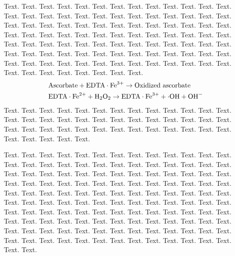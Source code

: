 \documentclass[a4,center,fleqn]{NAR}
\begin{document}
Text. Text. Text. Text. Text. Text. Text. Text. Text. Text. Text.
Text. Text. Text. Text. Text. Text. Text. Text. Text. Text. Text.
Text. Text. Text. Text. Text. Text. Text. Text. Text. Text. Text.
Text. Text. Text. Text. Text. Text. Text. Text. Text. Text. Text.
Text. Text. Text. Text. Text. Text. Text. Text. Text. Text. Text.
Text. Text. Text. Text. Text. Text. Text. Text. Text. Text. Text.
Text. Text. Text. Text. Text. Text. Text. Text. Text. Text. Text.
Text. Text. Text. Text. Text. Text. Text. Text. Text. Text. Text.
Text. Text. Text. Text. Text. Text. Text. Text. Text. Text. Text.
\begin{align*}
&\mathrm{Ascorbate} + \mathrm{EDTA} \cdot \mathrm{Fe}^{3+} \to
\hbox{Oxidized ascorbate}
\\
&\mathrm{EDTA} \cdot \mathrm{Fe}^{2+} + \mathrm{H}_2
\mathrm{O}_2 \to
\mathrm{EDTA} \cdot \mathrm{Fe}^{3+} + \cdot
\mathrm{OH} + \mathrm{OH}^-
\end{align*}
Text. Text. Text. Text. Text. Text. Text. Text. Text. Text. Text.
Text. Text. Text. Text. Text. Text. Text. Text. Text. Text. Text.
Text. Text. Text. Text. Text. Text. Text. Text. Text. Text. Text.
Text. Text. Text. Text. Text. Text. Text. Text. Text. Text. Text.

Text. Text. Text. Text. Text. Text. Text. Text. Text. Text. Text.
Text. Text. Text. Text. Text. Text. Text. Text. Text. Text. Text.
Text. Text. Text. Text. Text. Text. Text. Text. Text. Text. Text.
Text. Text. Text. Text. Text. Text. Text. Text. Text. Text. Text.
Text. Text. Text. Text. Text. Text. Text. Text. Text. Text. Text.
Text. Text. Text. Text. Text. Text. Text. Text. Text. Text. Text.
Text. Text. Text. Text. Text. Text. Text. Text. Text. Text. Text.
Text. Text. Text. Text. Text. Text. Text. Text. Text. Text. Text.
Text. Text. Text. Text. Text. Text. Text. Text. Text. Text. Text.
Text. Text. Text. Text. Text. Text. Text. Text. Text. Text. Text.
Text. Text. Text. Text. Text. Text. Text. Text. Text. Text. Text.
Text. Text. Text. Text. Text. Text. Text. Text. Text. Text. Text.
\enlargethispage{-65.1pt}
\end{document}
